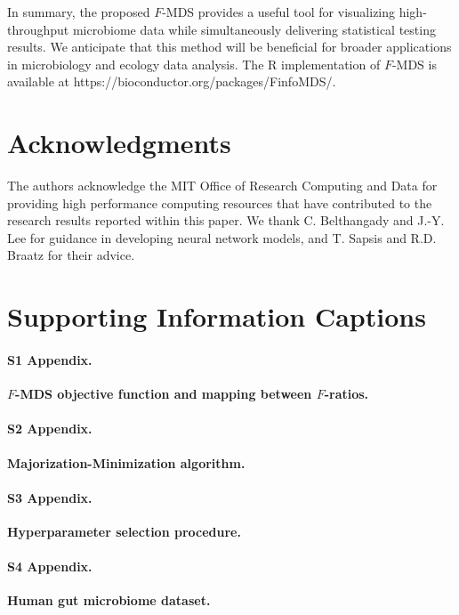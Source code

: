 \documentclass[10pt,letterpaper]{article}
\newcommand{\1}{{\rm 1}\kern-0.24em{\rm I}}
\begin{document}
In summary, the proposed $F$-MDS provides a useful tool for visualizing high-throughput microbiome data while simultaneously delivering statistical testing results. We anticipate that this method will be beneficial for broader applications in microbiology and ecology data analysis. The R implementation of $F$-MDS is available at https://bioconductor.org/packages/FinfoMDS/.



\section*{Acknowledgments}
The authors acknowledge the MIT Office of Research Computing and Data for providing high performance computing resources that have contributed to the research results reported within this paper. We thank C. Belthangady and J.-Y. Lee for guidance in developing neural network models, and T. Sapsis and R.D. Braatz for their advice.


\nolinenumbers




\section*{Supporting Information Captions}

\paragraph*{S1 Appendix.}
\label{sec:app1}
{\bf $F$-MDS objective function and mapping between $F$-ratios.}

\paragraph*{S2 Appendix.}
\label{sec:app2}
{\bf Majorization-Minimization algorithm.}

\paragraph*{S3 Appendix.}
\label{sec:app3_rev}
{\bf Hyperparameter selection procedure.}

\paragraph*{S4 Appendix.}
\label{sec:app4_rev}
{\bf Human gut microbiome dataset.}
\end{document}
